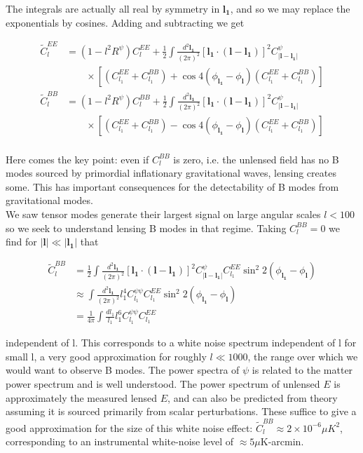 \documentclass[a4paper,10pt]{article}
\renewcommand{\v}[1]{\mathbf{#1}}
\newcommand{\half}{\frac{1}{2}}
\newcommand{\finttwo}[1]{\int \frac{d^2 \v{#1}}{(2\pi)^2}}
\begin{document}
The integrals are actually all real by symmetry in $\v{l_1}$, and so we may replace the exponentials by cosines. Adding and subtracting we get

\begin{equation}\begin{split}
\tilde{C}_l^{EE} &= (1-l^2R^\psi)C_l^{EE}+\half \finttwo{l_1}[ \v{l_1}\cdot(\v{l}-\v{l_1})]^2 C^\psi_{|\v{l}-\v{l_1}|}\\
&\qquad \times [(C_{l_1}^{EE}+C_{l_1}^{BB})+\cos{4(\phi_\v{l_1}-\phi_\v{l})}(C_{l_1}^{EE}+C_{l_1}^{BB})]\\
\tilde{C}_l^{BB} &= (1-l^2R^\psi)C_l^{BB}+\half \finttwo{l_1}[ \v{l_1}\cdot(\v{l}-\v{l_1})]^2 C^\psi_{|\v{l}-\v{l_1}|}\\
&\qquad \times [(C_{l_1}^{EE}+C_{l_1}^{BB})-\cos{4(\phi_\v{l_1}-\phi_\v{l})}(C_{l_1}^{EE}+C_{l_1}^{BB})]\\
\label{lensedBmodes}
\end{split}\end{equation}

Here comes the key point: even if $C_{l}^{BB}$ is zero, i.e. the unlensed field has no B modes sourced by primordial inflationary gravitational waves, lensing creates some. This has important consequences for the detectability of B modes from gravitational modes.\\

We saw tensor modes generate their largest signal on large angular scales $l<100$ so we seek to understand lensing B modes in that regime. Taking $C_l^{BB}=0$ we find for $|\v{l}| \ll |\v{l_1}|$ that 

\begin{equation}\begin{split}
\tilde{C}_l^{BB} &= \half \finttwo{l_1}[ \v{l_1}\cdot(\v{l}-\v{l_1})]^2 C^\psi_{|\v{l}-\v{l_1}|}C_{l_1}^{EE}\sin^2{2(\phi_\v{l_1}-\phi_\v{l})}\\
&\approx \finttwo{l_1} l_1^4C^{\psi\psi}_{l_1}C^{EE}_{l_1}\sin^2{2(\phi_\v{l_1}-\phi_\v{l})}\\
&=\frac{1}{4\pi}\int \frac{dl_1}{l_1}l_1^6C^{\psi\psi}_{l_1}C^{EE}_{l_1}
\end{split}\end{equation}

independent of l. This corresponds to a white noise spectrum independent of l for small l, a very good approximation for roughly $l\ll 1000$, the range over which we would want to observe B modes. The power spectra of $\psi$ is related to the matter power spectrum and is well understood. The power spectrum of unlensed $E$ is approximately the measured lensed $E$, and can also be predicted from theory assuming it is sourced primarily from scalar perturbations. These suffice to give a good approximation for the size of this white noise effect: $\tilde{C}_l^{BB} \approx 2\times10^{-6}\mu K^2$, corresponding to an instrumental white-noise level of $\approx 5\mu$K-arcmin.\\
\end{document}
